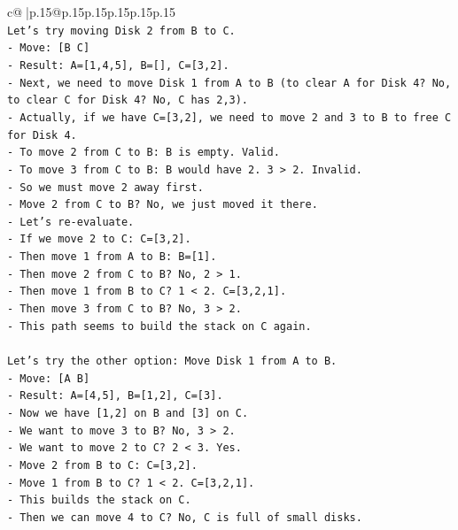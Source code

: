\documentclass{article}
\begin{document}
{\begin{supertabular}{c@{$\;$}|p{.15\linewidth}@{}p{.15\linewidth}p{.15\linewidth}p{.15\linewidth}p{.15\linewidth}p{.15\linewidth}}
{{{\\ 
\texttt{Let's try moving Disk 2 from B to C.} \\
\texttt{{-} Move: {[}B C{]}} \\
\texttt{{-} Result: A={[}1,4,5{]}, B={[}{]}, C={[}3,2{]}.} \\
\texttt{{-} Next, we need to move Disk 1 from A to B (to clear A for Disk 4? No, to clear C for Disk 4? No, C has 2,3).} \\
\texttt{{-} Actually, if we have C={[}3,2{]}, we need to move 2 and 3 to B to free C for Disk 4.} \\
\texttt{{-} To move 2 from C to B: B is empty. Valid.} \\
\texttt{{-} To move 3 from C to B: B would have 2. 3 > 2. Invalid.} \\
\texttt{{-} So we must move 2 away first.} \\
\texttt{{-} Move 2 from C to B? No, we just moved it there.} \\
\texttt{{-} Let's re{-}evaluate.} \\
\texttt{{-} If we move 2 to C: C={[}3,2{]}.} \\
\texttt{{-} Then move 1 from A to B: B={[}1{]}.} \\
\texttt{{-} Then move 2 from C to B? No, 2 > 1.} \\
\texttt{{-} Then move 1 from B to C? 1 < 2. C={[}3,2,1{]}.} \\
\texttt{{-} Then move 3 from C to B? No, 3 > 2.} \\
\texttt{{-} This path seems to build the stack on C again.} \\
\\ 
\texttt{Let's try the other option: Move Disk 1 from A to B.} \\
\texttt{{-} Move: {[}A B{]}} \\
\texttt{{-} Result: A={[}4,5{]}, B={[}1,2{]}, C={[}3{]}.} \\
\texttt{{-} Now we have {[}1,2{]} on B and {[}3{]} on C.} \\
\texttt{{-} We want to move 3 to B? No, 3 > 2.} \\
\texttt{{-} We want to move 2 to C? 2 < 3. Yes.} \\
\texttt{{-} Move 2 from B to C: C={[}3,2{]}.} \\
\texttt{{-} Move 1 from B to C? 1 < 2. C={[}3,2,1{]}.} \\
\texttt{{-} This builds the stack on C.} \\
\texttt{{-} Then we can move 4 to C? No, C is full of small disks.} \\
}}}
\end{supertabular}}
\end{document}
